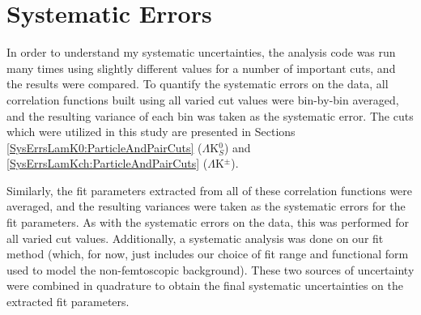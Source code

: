 \documentclass[../AnalysisNoteJBuxton.tex]{subfiles}
\begin{document}
\section{Systematic Errors}
\label{SystematicErrors}

In order to understand my systematic uncertainties, the analysis code was run many times using slightly different values for a number of important cuts, and the results were compared.  To quantify the systematic errors on the data, all correlation functions built using all varied cut values were bin-by-bin averaged, and the resulting variance of each bin was taken as the systematic error.  The cuts which were utilized in this study are presented in Sections \ref{SysErrsLamK0:ParticleAndPairCuts} ($\Lambda$K$^{0}_{S}$) and \ref{SysErrsLamKch:ParticleAndPairCuts} ($\Lambda$K$^{\pm}$).


Similarly, the fit parameters extracted from all of these correlation functions were averaged, and the resulting variances were taken as the systematic errors for the fit parameters.
As with the systematic errors on the data, this was performed for all varied cut values.
Additionally, a systematic analysis was done on our fit method (which, for now, just includes our choice of fit range and functional form used to model the non-femtoscopic background).
These two sources of uncertainty were combined in quadrature to obtain the final systematic uncertainties on the extracted fit parameters.





\end{document}
